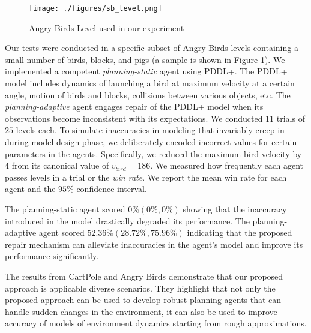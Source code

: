 \documentclass[letterpaper]{article} %
\begin{document}
\begin{figure}
    \centering
    \texttt{[image: ./figures/sb\_level.png]}
    \caption{Angry Birds Level used in our experiment}
    \label{fig:ab_level}
\end{figure}


Our tests were conducted in a specific subset of Angry Birds levels containing a small number of birds, blocks, and pigs (a sample is shown in Figure \ref{fig:ab_level}). We implemented a competent \emph{planning-static} agent using PDDL+. The PDDL+ model includes dynamics of launching a bird at maximum velocity at a certain angle, motion of birds and blocks, collisions between various objects, etc. The \emph{planning-adaptive} agent engages repair of the PDDL+ model when its observations become inconsistent with its expectations. We conducted $11$ trials of $25$ levels each. To simulate inaccuracies in modeling that invariably creep in during model design phase, we deliberately encoded incorrect values for certain parameters in the agents. Specifically, we reduced the maximum bird velocity by $4$ from its canonical value of $v_{bird}=186$. We measured how frequently each agent passes levels in a trial or the \emph{win rate}. 
We report the mean win rate for each agent and the $95\%$ confidence interval. 

The planning-static agent scored $0\% (0\%, 0\%)$ showing that the inaccuracy introduced in the model drastically degraded its performance. The planning-adaptive agent scored $52.36\% (28.72\%, 75.96\%)$ indicating that the proposed repair mechanism can alleviate inaccuracies in the agent's model and improve its performance significantly.


The results from CartPole and Angry Birds demonstrate that our proposed approach is applicable diverse scenarios. They highlight that not only the proposed approach can be used to develop robust planning agents that can handle sudden changes in the environment, it can also be used to improve accuracy of models of environment dynamics starting from rough approximations. 
\end{document}
